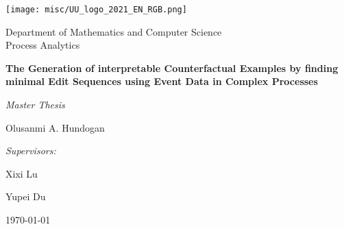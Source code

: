 \documentclass[./../paper.tex]{subfiles}
\begin{document}
\begin{titlepage}
    \centering
    \texttt{[image: misc/UU\_logo\_2021\_EN\_RGB.png]}\par
    Department of Mathematics and Computer Science\\
    Process Analytics

    \vspace{3cm}
    {\LARGE\textbf{The Generation of interpretable Counterfactual Examples by finding minimal Edit Sequences using Event Data in Complex Processes}}\par\vspace{0.5cm}
    {\large\textit{Master Thesis}}\par\vspace{1cm}
    {\large Olusanmi A. Hundogan}\par

    \vfill

    \emph{Supervisors:}\par
    Xixi Lu\par
    Yupei Du\par

    \today 
    \vspace{2cm}


\end{titlepage}
\end{document}
